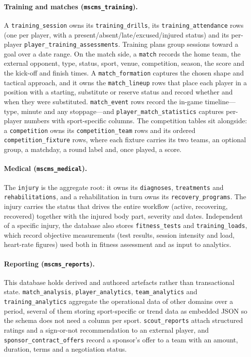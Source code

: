 \paragraph{Training and matches (\texttt{mscms\_training}).} A \texttt{training\_session}
owns its \texttt{training\_drills}, its \texttt{training\_attendance} rows (one per
player, with a present/absent/late/excused/injured status) and its per-player
\texttt{player\_training\_assessments}. Training plans group sessions toward a goal over
a date range. On the match side, a \texttt{match} records the home team, the external
opponent, type, status, sport, venue, competition, season, the score and the kick-off
and finish times. A \texttt{match\_formation} captures the chosen shape and tactical
approach, and it owns the \texttt{match\_lineup} rows that place each player in a
position with a starting, substitute or reserve status and record whether and when they
were substituted. \texttt{match\_event} rows record the in-game timeline---type, minute
and any stoppage---and \texttt{player\_match\_statistics} captures per-player numbers
with sport-specific columns. The competition tables sit alongside: a \texttt{competition}
owns its \texttt{competition\_team} rows and its ordered \texttt{competition\_fixture}
rows, where each fixture carries its two teams, an optional group, a matchday, a round
label and, once played, a score.

\paragraph{Medical (\texttt{mscms\_medical}).} The \texttt{injury} is the aggregate
root: it owns its \texttt{diagnoses}, \texttt{treatments} and \texttt{rehabilitations},
and a rehabilitation in turn owns its \texttt{recovery\_programs}. The injury carries
the status that drives the entire workflow (active, recovering, recovered) together with
the injured body part, severity and dates. Independent of a specific injury, the
database also stores \texttt{fitness\_tests} and \texttt{training\_loads}, which record
objective measurements (test results, session intensity and load, heart-rate figures)
used both in fitness assessment and as input to analytics.

\paragraph{Reporting (\texttt{mscms\_reports}).} This database holds derived and authored
artefacts rather than transactional state. \texttt{match\_analysis}, \texttt{player\_analytics},
\texttt{team\_analytics} and \texttt{training\_analytics} aggregate the operational data
of other domains over a period, several of them storing sport-specific or trend data as
embedded JSON so the schema does not need a column per sport. \texttt{scout\_reports}
attach structured ratings and a sign-or-not recommendation to an external player, and
\texttt{sponsor\_contract\_offers} record a sponsor's offer to a team with an amount,
duration, terms and a negotiation status.

